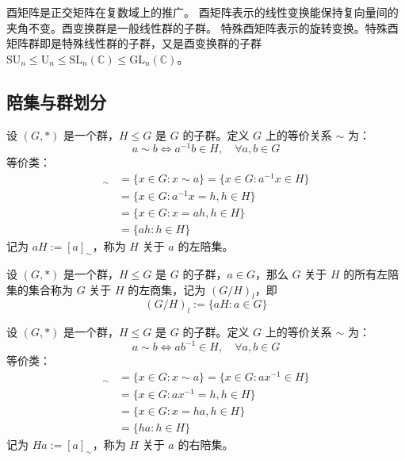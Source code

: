 \begin{note}
    酉矩阵是正交矩阵在复数域上的推广。
    酉矩阵表示的线性变换能保持复向量间的夹角不变。酉变换群是一般线性群的子群。
    特殊酉矩阵表示的旋转变换。特殊酉矩阵群即是特殊线性群的子群，又是酉变换群的子群 $\mathrm{SU}_n \leq \mathrm{U}_n \leq \mathrm{SL}_n(\mathbb{C}) \leq \mathrm{GL}_n(\mathbb{C})$。
\end{note}

\vspace{1em}
\subsection{陪集与群划分}
\begin{definition}
    设 $(G, *)$ 是一个群，$H \le G$ 是 $G$ 的子群。定义 $G$ 上的等价关系 $\sim$ 为：
    \[
        a \sim b \iff a^{-1}b \in H, \quad \forall a, b \in G
    \]
    等价类：
    \begin{align*}
        [a]_{\sim} &= \{x\in G:x\sim a\} = \{x\in G:a^{-1}x\in H\}\\
        &=\{x\in G:a^{-1}x = h,h\in H\}\\
        &=\{x\in G:x=ah,h\in H\}\\
        &=\{ah:h\in H\}
    \end{align*}
    记为 $aH := [a]_{\sim}$，称为 $H$ 关于 $a$ 的左陪集。
\end{definition}

\begin{definition}
    设 $(G, *)$ 是一个群，$H \le G$ 是 $G$ 的子群，$a\in G$，那么 $G$ 关于 $H$ 的所有左陪集的集合称为 $G$ 关于 $H$ 的左商集，记为 $(G/H)_l$，即
    \[
        (G/H)_l := \{aH:a\in G\}
    \]
\end{definition}

\begin{definition}
    设 $(G, *)$ 是一个群，$H \le G$ 是 $G$ 的子群。定义 $G$ 上的等价关系 $\sim$ 为：
    \[
        a \sim b \iff ab^{-1} \in H, \quad \forall a, b \in G
    \]
    等价类：
    \begin{align*}
        [a]_{\sim} &= \{x\in G:x\sim a\} = \{x\in G:ax^{-1}\in H\}\\
        &=\{x\in G:ax^{-1} = h,h\in H\}\\
        &=\{x\in G:x=ha,h\in H\}\\
        &=\{ha:h\in H\}
    \end{align*}
    记为 $Ha := [a]_{\sim}$，称为 $H$ 关于 $a$ 的右陪集。
\end{definition}

